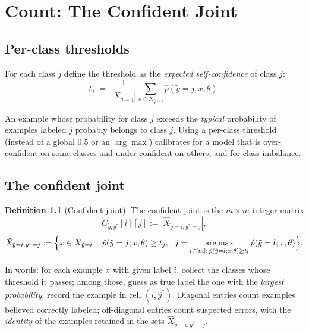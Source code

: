 \documentclass[11pt,a4paper]{report}
\newcommand{\Cyy}{C_{\tilde y,y^*}}
\newcommand{\argmax}{\operatorname*{arg\,max}}
\newcommand{\1}{\mathbf 1}
\theoremstyle{definition}
\newtheorem{definition}{Definition}[chapter]
\theoremstyle{plain}
\theoremstyle{remark}
\begin{document}
\chapter{Count: The Confident Joint}

\section{Per-class thresholds}
For each class $j$ define the threshold as the \emph{expected self-confidence} of class $j$:
\begin{equation}\label{eq:thresh}
t_j \;=\; \frac{1}{|X_{\tilde y=j}|}\sum_{x\in X_{\tilde y=j}} \hat p(\tilde y=j;x,\theta).
\end{equation}

\begin{intuition}
An example whose probability for class $j$ exceeds the \emph{typical} probability of examples labeled $j$ probably belongs to class $j$. Using a per-class threshold (instead of a global $0.5$ or an $\arg\max$) calibrates for a model that is over-confident on some classes and under-confident on others, and for class imbalance.
\end{intuition}

\section{The confident joint}
\begin{definition}[Confident joint]
The confident joint is the $m\times m$ integer matrix
\begin{equation}\label{eq:cj}
\Cyy[i][j] := |\hat X_{\tilde y=i,y^*=j}|,
\end{equation}
\[
\hat X_{\tilde y=i,y^*=j} := \Bigl\{x\in X_{\tilde y=i}:\ \hat p(\tilde y=j;x,\theta)\ge t_j,\ \ j=\argmax_{l\in[m]:\,\hat p(\tilde y=l;x,\theta)\ge t_l}\hat p(\tilde y=l;x,\theta)\Bigr\}.
\]
\end{definition}
In words: for each example $x$ with given label $i$, collect the classes whose threshold it passes; among those, guess as true label the one with the \emph{largest probability}; record the example in cell $(i,\hat y^*)$. Diagonal entries count examples believed correctly labeled; off-diagonal entries count suspected errors, with the \emph{identity} of the examples retained in the sets $\hat X_{\tilde y=i,y^*=j}$.
\end{document}
